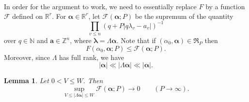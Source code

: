 \documentclass[12pt,reqno]{amsart}
\newtheorem{lemma}[thm]{Lemma}
\theoremstyle{definition}
\theoremstyle{remark}
\numberwithin{equation}{section}
\begin{document}
In order for the argument to work, we need to essentially replace $F$ by a function ${\mathcal F}$ defined on ${\mathbb R}^r$. For ${\boldsymbol{{\alpha}}} \in {\mathbb R}^r$, let ${\mathcal F}({\boldsymbol{{\alpha}}}; P)$ be the supremum of the quantity
\[
\prod_{v {\leqslant} n} (q + P|q {{\lambda}}_v - a_v|)^{-1}
\]
over $q \in {\mathbb N}$ and ${\mathbf a} \in {\mathbb Z}^n$, where  ${{\boldsymbol {{\lambda}}}} = {{\Lambda}} {\boldsymbol{{\alpha}}}$. Note that if $({{\alpha}}_0,{\boldsymbol{{\alpha}}}) \in {\mathfrak R}_P$ then
\begin{equation} \label{Fs}
F({{\alpha}}_0, {\boldsymbol{{\alpha}}}; P) {\leqslant} {\mathcal F}({\boldsymbol{{\alpha}}}; P).
\end{equation}
Moreover, since ${{\Lambda}}$ has full rank, we have
\begin{equation} \label{Lam}
|{\boldsymbol{{\alpha}}}| \ll |{{\Lambda}} {\boldsymbol{{\alpha}}}| \ll |{\boldsymbol{{\alpha}}}|.
\end{equation}

\begin{lemma} \label{BGF1}
Let $0 < V {\leqslant} W$. Then
\begin{equation} \label{BGF1eq}
\sup_{V {\leqslant} |{{\Lambda}} {\boldsymbol{{\alpha}}}| {\leqslant} W} {\mathcal F}({\boldsymbol{{\alpha}}}; P) \to 0 \qquad (P \to \infty).
\end{equation}
\end{lemma}
\end{document}
